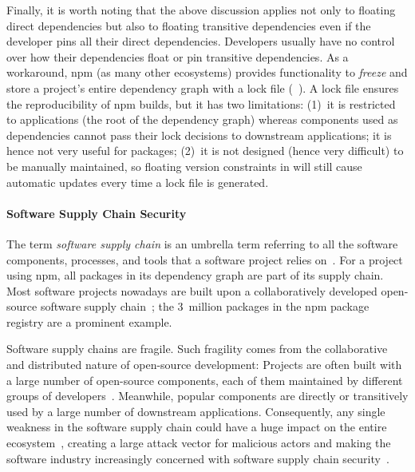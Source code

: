 Finally, it is worth noting that the above discussion applies not only to floating direct dependencies but also to floating transitive dependencies even if the developer pins all their direct dependencies.
Developers usually have no control over how their dependencies float or pin transitive dependencies.
As a workaround, npm (as many other ecosystems) provides functionality to \textit{freeze} and store a project's entire dependency graph with a lock file (~\cite{npmpkglock}). %
A lock file ensures the reproducibility of npm builds, but
it has two limitations: (1)~it is restricted to applications (the root of the dependency graph) whereas components used as dependencies cannot pass their lock decisions to downstream applications; it is hence not very useful for packages; (2)~it is not designed (hence very difficult) to be manually maintained, so floating version constraints in  will still cause automatic updates every time a lock file is generated.

\paragraph{Software Supply Chain Security}

The term \textit{software supply chain} is an umbrella term referring to all the software components, processes, and tools that a software project relies on~\cite{software-supply-chain-guide}.
For a project using npm, all packages in its dependency graph are part of its supply chain.
Most software projects nowadays are built upon a collaboratively developed open-source software supply chain~\cite{eghbal2016roads}; the 3~million packages in the npm package registry are a prominent example.

Software supply chains are fragile.
Such fragility comes from the collaborative and distributed nature of open-source development: Projects are often built with a large number of open-source components, each of them maintained by different groups of developers~\cite{schueller2024modeling}.
Meanwhile, popular components are directly or transitively used by a large number of downstream applications.
Consequently, any single weakness in the software supply chain could have a huge impact on the entire ecosystem~\cite{DBLP:journals/ese/DecanMG19, DBLP:conf/uss/ZimmermannSTP19}, creating a large attack vector for malicious actors and making the software industry increasingly concerned with software supply chain security~\cite{DBLP:journals/usenix-login/GeerTM20,DBLP:conf/sp/LadisaPMB23}.

